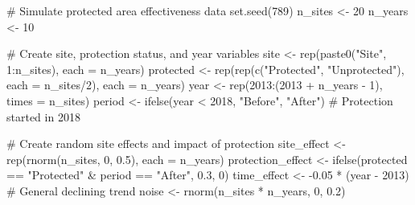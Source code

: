 \documentclass[
  letterpaper,
]{book}
\newenvironment{Shaded}{\begin{snugshade}}{\end{snugshade}}
\newcommand{\AttributeTok}[1]{\textcolor[rgb]{0.40,0.45,0.13}{#1}}
\newcommand{\CommentTok}[1]{\textcolor[rgb]{0.37,0.37,0.37}{#1}}
\newcommand{\DecValTok}[1]{\textcolor[rgb]{0.68,0.00,0.00}{#1}}
\newcommand{\FloatTok}[1]{\textcolor[rgb]{0.68,0.00,0.00}{#1}}
\newcommand{\FunctionTok}[1]{\textcolor[rgb]{0.28,0.35,0.67}{#1}}
\newcommand{\NormalTok}[1]{\textcolor[rgb]{0.00,0.23,0.31}{#1}}
\newcommand{\OtherTok}[1]{\textcolor[rgb]{0.00,0.23,0.31}{#1}}
\newcommand{\SpecialCharTok}[1]{\textcolor[rgb]{0.37,0.37,0.37}{#1}}
\newcommand{\StringTok}[1]{\textcolor[rgb]{0.13,0.47,0.30}{#1}}
\begin{document}
\begin{Shaded}
\begin{Highlighting}[]
\CommentTok{\# Simulate protected area effectiveness data}
\FunctionTok{set.seed}\NormalTok{(}\DecValTok{789}\NormalTok{)}
\NormalTok{n\_sites }\OtherTok{\textless{}{-}} \DecValTok{20}
\NormalTok{n\_years }\OtherTok{\textless{}{-}} \DecValTok{10}

\CommentTok{\# Create site, protection status, and year variables}
\NormalTok{site }\OtherTok{\textless{}{-}} \FunctionTok{rep}\NormalTok{(}\FunctionTok{paste0}\NormalTok{(}\StringTok{"Site"}\NormalTok{, }\DecValTok{1}\SpecialCharTok{:}\NormalTok{n\_sites), }\AttributeTok{each =}\NormalTok{ n\_years)}
\NormalTok{protected }\OtherTok{\textless{}{-}} \FunctionTok{rep}\NormalTok{(}\FunctionTok{rep}\NormalTok{(}\FunctionTok{c}\NormalTok{(}\StringTok{"Protected"}\NormalTok{, }\StringTok{"Unprotected"}\NormalTok{), }\AttributeTok{each =}\NormalTok{ n\_sites}\SpecialCharTok{/}\DecValTok{2}\NormalTok{), }\AttributeTok{each =}\NormalTok{ n\_years)}
\NormalTok{year }\OtherTok{\textless{}{-}} \FunctionTok{rep}\NormalTok{(}\DecValTok{2013}\SpecialCharTok{:}\NormalTok{(}\DecValTok{2013} \SpecialCharTok{+}\NormalTok{ n\_years }\SpecialCharTok{{-}} \DecValTok{1}\NormalTok{), }\AttributeTok{times =}\NormalTok{ n\_sites)}
\NormalTok{period }\OtherTok{\textless{}{-}} \FunctionTok{ifelse}\NormalTok{(year }\SpecialCharTok{\textless{}} \DecValTok{2018}\NormalTok{, }\StringTok{"Before"}\NormalTok{, }\StringTok{"After"}\NormalTok{)  }\CommentTok{\# Protection started in 2018}

\CommentTok{\# Create random site effects and impact of protection}
\NormalTok{site\_effect }\OtherTok{\textless{}{-}} \FunctionTok{rep}\NormalTok{(}\FunctionTok{rnorm}\NormalTok{(n\_sites, }\DecValTok{0}\NormalTok{, }\FloatTok{0.5}\NormalTok{), }\AttributeTok{each =}\NormalTok{ n\_years)}
\NormalTok{protection\_effect }\OtherTok{\textless{}{-}} \FunctionTok{ifelse}\NormalTok{(protected }\SpecialCharTok{==} \StringTok{"Protected"} \SpecialCharTok{\&}\NormalTok{ period }\SpecialCharTok{==} \StringTok{"After"}\NormalTok{, }\FloatTok{0.3}\NormalTok{, }\DecValTok{0}\NormalTok{)}
\NormalTok{time\_effect }\OtherTok{\textless{}{-}} \SpecialCharTok{{-}}\FloatTok{0.05} \SpecialCharTok{*}\NormalTok{ (year }\SpecialCharTok{{-}} \DecValTok{2013}\NormalTok{)  }\CommentTok{\# General declining trend}
\NormalTok{noise }\OtherTok{\textless{}{-}} \FunctionTok{rnorm}\NormalTok{(n\_sites }\SpecialCharTok{*}\NormalTok{ n\_years, }\DecValTok{0}\NormalTok{, }\FloatTok{0.2}\NormalTok{)}


\end{Highlighting}
\end{Shaded}
\end{document}
